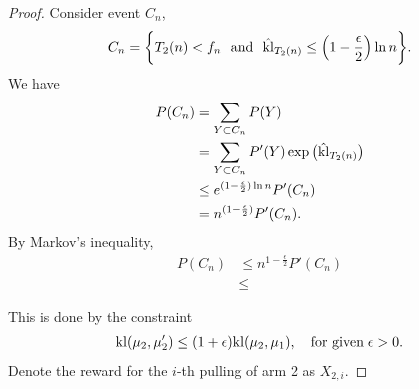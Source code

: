 \begin{proof}
    Consider event $C_n$,
    \begin{align}
        C_n=\bigg\{ T_2(n)<f_n
            ~~\text{and}~~
            \hat {{\mathop{\mathrm{kl}}}}_{T_2(n)} \le \Big(1-\frac{\epsilon}{2}\Big)\ln n \bigg\}.
    \end{align}
    We have
    \begin{align}
        P(C_n)
            &= \sum_{Y\subset C_n} P(Y) \\
            &= \sum_{Y\subset C_n} P'(Y) \exp\big(\hat{{\mathop{\mathrm{kl}}}}_{T_2(n)}\big) \\
            &\le e^{(1-\frac{\epsilon}{2})\ln n} P'(C_n) \\
            &= n^{(1-\frac{\epsilon}{2})} P'(C_n).
    \end{align}
    By Markov's inequality,
    \begin{align}
        P(C_n)
            &\le n^{1-\frac{\epsilon}{2}} P'(C_n) \\
            &\le
    \end{align}

    This is done by the constraint
    \begin{align}
        {\mathop{\mathrm{kl}}}(\mu_2, \mu_2')\le(1+\epsilon){\mathop{\mathrm{kl}}}(\mu_2,\mu_1), \quad \text{for given}\; \epsilon>0.
    \end{align}
    Denote the reward for the $i$-th pulling of arm 2 as $X_{2,i}$.






\end{proof}
